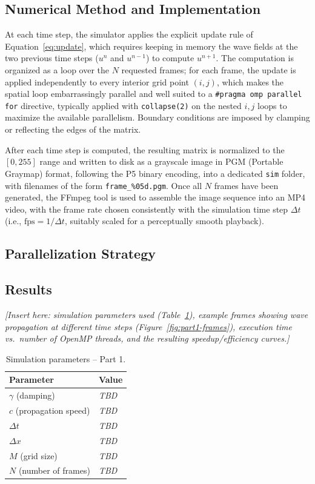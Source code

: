 \documentclass[10pt,twocolumn]{article}
\begin{document}
\subsection{Numerical Method and Implementation}
At each time step, the simulator applies the explicit update rule of
Equation~\eqref{eq:update}, which requires keeping in memory the wave fields at the two
previous time steps ($u^{n}$ and $u^{n-1}$) to compute $u^{n+1}$. The computation is organized
as a loop over the $N$ requested frames; for each frame, the update is applied independently
to every interior grid point $(i,j)$, which makes the spatial loop embarrassingly parallel and
well suited to a \texttt{\#pragma omp parallel for} directive, typically applied with
\texttt{collapse(2)} on the nested $i,j$ loops to maximize the available parallelism. Boundary
conditions are imposed by clamping or reflecting the edges of the matrix.

After each time step is computed, the resulting matrix is normalized to the $[0,255]$ range
and written to disk as a grayscale image in PGM (Portable Graymap) format, following the P5
binary encoding, into a dedicated \texttt{sim} folder, with filenames of the form
\texttt{frame\_\%05d.pgm}. Once all $N$ frames have been generated, the FFmpeg tool is used to
assemble the image sequence into an MP4 video, with the frame rate chosen consistently with the
simulation time step $\Delta t$ (i.e., $\text{fps} = 1/\Delta t$, suitably scaled for a
perceptually smooth playback).

\subsection{Parallelization Strategy}

\subsection{Results}
\textit{[Insert here: simulation parameters used (Table~\ref{tab:part1-params}), example
frames showing wave propagation at different time steps (Figure~\ref{fig:part1-frames}),
execution time vs.\ number of OpenMP threads, and the resulting speedup/efficiency curves.]}

\begin{table}[h]
\centering
\caption{Simulation parameters -- Part 1.}
\label{tab:part1-params}
\begin{tabular}{ll}
\toprule
Parameter & Value \\
\midrule
$\gamma$ (damping)        & \textit{TBD} \\
$c$ (propagation speed)   & \textit{TBD} \\
$\Delta t$                & \textit{TBD} \\
$\Delta x$                & \textit{TBD} \\
$M$ (grid size)           & \textit{TBD} \\
$N$ (number of frames)    & \textit{TBD} \\
\bottomrule
\end{tabular}
\end{table}
\end{document}
